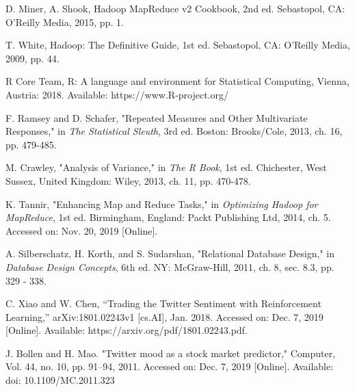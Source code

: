 \documentclass[journal]{IEEEtran}
\begin{document}
\begin{thebibliography}{1}
D. Miner, A. Shook, Hadoop MapReduce v2 Cookbook, 2nd ed. Sebastopol, CA: O'Reilly Media,
 2015, pp. 1.
 
T. White, Hadoop: The Definitive Guide, 1st ed. Sebastopol,
 CA: O'Reilly Media, 2009, pp. 44.

R Core Team, R: A language and environment for Statistical Computing, Vienna, Austria: 2018.
 Available: https://www.R-project.org/
 
F. Ramsey and D. Schafer, "Repeated Measures and Other Multivariate Responses," 
 in \textit{The Statistical Sleuth}, 3rd ed. Boston: Brooks/Cole, 2013,
 ch. 16, pp. 479-485.  

M. Crawley, "Analysis of Variance," in \textit{The R Book},
 1st ed. Chichester, West Sussex, United Kingdom: Wiley, 2013,
 ch. 11, pp. 470-478.

K. Tannir, "Enhancing Map and Reduce Tasks," in 
 \textit{Optimizing Hadoop for MapReduce},
 1st ed. Birmingham, England: Packt Publishing Ltd, 2014,
 ch. 5. Accessed on: Nov. 20, 2019 [Online]. 
 
A. Silberschatz, H. Korth, and S. Sudarshan, "Relational Database Design," in
 \textit{Database Design Concepts}, 6th ed. NY: McGraw-Hill, 2011, ch. 8, sec. 8.3,
 pp. 329 - 338. 

C. Xiao and W. Chen, “Trading the Twitter Sentiment with Reinforcement Learning,”
 arXiv:1801.02243v1 [cs.AI], Jan. 2018. Accessed on: Dec. 7, 2019 [Online].
 Available: https://arxiv.org/pdf/1801.02243.pdf.

J. Bollen and H. Mao. "Twitter mood as a stock market predictor,"
 Computer, Vol. 44, no. 10, pp. 91–94, 2011. Accessed on: Dec. 7, 2019 [Online].
 Available: doi: 10.1109/MC.2011.323


\end{thebibliography}



\end{document}
